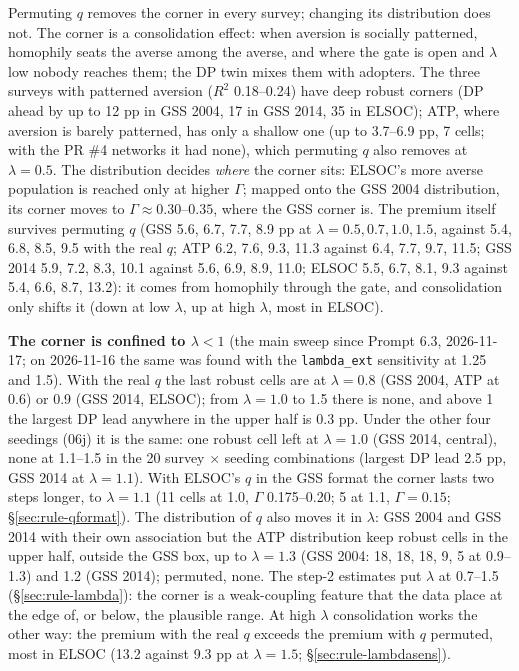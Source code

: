 \documentclass[11pt,a4paper]{article}
\newcommand{\code}[1]{\texttt{#1}}
\begin{document}
\noindent Permuting $q$ removes the corner in every survey; changing its distribution does not. The
corner is a consolidation effect: when aversion is socially patterned, homophily seats the averse among
the averse, and where the gate is open and $\lambda$ low nobody reaches them; the DP twin mixes them with
adopters. The three surveys with patterned aversion ($R^2$ 0.18--0.24) have deep robust corners (DP
ahead by up to 12 pp in GSS 2004, 17 in GSS 2014, 35 in ELSOC); ATP, where aversion is barely patterned,
has only a shallow one (up to 3.7--6.9 pp, 7 cells; with the PR \#4 networks it had none), which
permuting $q$ also removes at $\lambda = 0.5$. The distribution decides \emph{where} the corner sits: ELSOC's
more averse population is reached only at higher $\Gamma$; mapped onto the GSS 2004 distribution, its corner
moves to $\Gamma \approx 0.30$--$0.35$, where the GSS corner is. The premium itself survives permuting $q$
(GSS 5.6, 6.7, 7.7, 8.9 pp at $\lambda = 0.5, 0.7, 1.0, 1.5$, against 5.4, 6.8, 8.5, 9.5 with the real $q$; ATP
6.2, 7.6, 9.3, 11.3 against 6.4, 7.7, 9.7, 11.5; GSS 2014 5.9, 7.2, 8.3, 10.1 against 5.6, 6.9, 8.9, 11.0; ELSOC
5.5, 6.7, 8.1, 9.3 against 5.4, 6.6, 8.7, 13.2): it comes from homophily through the gate, and consolidation
only shifts it (down at low $\lambda$, up at high $\lambda$, most in ELSOC).

\noindent\textbf{The corner is confined to $\lambda < 1$} (the main sweep since Prompt 6.3, 2026-11-17; on
2026-11-16 the same was found with the \code{lambda\_ext} sensitivity at 1.25 and 1.5). With the real $q$ the last
robust cells are at $\lambda = 0.8$ (GSS 2004, ATP at 0.6) or 0.9 (GSS 2014, ELSOC); from $\lambda = 1.0$ to 1.5 there
is none, and above 1 the largest DP lead anywhere in the upper half is 0.3 pp. Under the other four seedings (06j)
it is the same: one robust cell left at $\lambda = 1.0$ (GSS 2014, central), none at 1.1--1.5 in the 20 survey
$\times$ seeding combinations (largest DP lead 2.5 pp, GSS 2014 at $\lambda = 1.1$). With ELSOC's $q$ in the GSS format
the corner lasts two steps longer, to $\lambda = 1.1$ (11 cells at 1.0, $\Gamma$ 0.175--0.20; 5 at 1.1, $\Gamma = 0.15$;
\S\ref{sec:rule-qformat}). The distribution of $q$ also moves it in $\lambda$: GSS 2004 and GSS 2014 with their own association but the
ATP distribution keep robust cells in the upper half, outside the GSS box, up to $\lambda = 1.3$ (GSS 2004: 18, 18,
18, 9, 5 at 0.9--1.3) and 1.2 (GSS 2014); permuted, none. The step-2 estimates put $\lambda$
at 0.7--1.5 (\S\ref{sec:rule-lambda}): the corner is a weak-coupling feature that the data place at the edge of, or
below, the plausible range. At high $\lambda$ consolidation works the other way: the premium with the real $q$
exceeds the premium with $q$ permuted, most in ELSOC (13.2 against 9.3 pp at $\lambda = 1.5$; \S\ref{sec:rule-lambdasens}).
\end{document}
